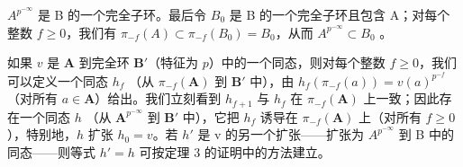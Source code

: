 \(A^{p^{-\infty}}\) 是 B 的一个完全子环。最后令 \(B_0\) 是 B 的一个完全子环且包含 A；对每个整数 \(f \geqslant 0\)，我们有 \(\pi_{-f}(A) \subset \pi_{-f}(B_0) = B_0\)，从而 \(A^{p^{-\infty}} \subset B_0\) 。

如果 \(v\) 是 \(\mathbf{A}\) 到完全环 \(\mathbf{B}'\)（特征为 \(p\)）中的一个同态，则对每个整数 \(f \geqslant 0\)，我们可以定义一个同态 \(h_f\) （从 \(\pi_{-f}(\mathbf{A})\) 到 \(\mathbf{B}'\) 中），由 \(h_f(\pi_{-f}(a)) = v(a)^{p^{-f}}\)（对所有 \(a \in \mathbf{A}\)）给出。我们立刻看到 \(h_{f + 1}\) 与 \(h_f\) 在 \(\pi_{-f}(\mathbf{A})\) 上一致；因此存在一个同态 \(h\) （从 \(\mathbf{A}^{p^{-\infty}}\) 到 \(\mathbf{B}'\) 中），它把 \(h_f\) 诱导在 \(\pi_{-f}(\mathbf{A})\) 上（对所有 \(f \geqslant 0\)），特别地，\(h\) 扩张 \(h_0 = v\)。若 \(h'\) 是 v 的另一个扩张——扩张为 \(A^{p^{-\infty}}\) 到 B 中的同态——则等式 \(h' = h\) 可按定理 3 的证明中的方法建立。

